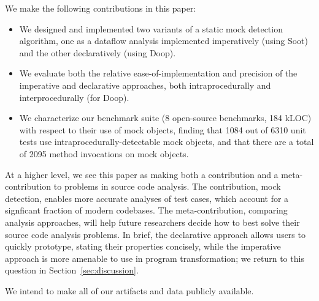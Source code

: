 We make the following contributions in this paper:
\begin{itemize}
\item We designed and implemented two variants of a static mock detection algorithm, one as a dataflow analysis implemented imperatively (using Soot) and the other declaratively (using Doop).
\item We evaluate both the relative ease-of-implementation and precision of the imperative and declarative approaches, both intraprocedurally and interprocedurally (for Doop). %
\item We characterize our benchmark suite (8 open-source benchmarks, 184 kLOC) with respect to their use of mock objects, finding that 1084 out of 6310 unit tests use intraprocedurally-detectable mock objects, and that there are a total of 2095 method invocations on mock objects. %
\end{itemize}
At a higher level, we see this paper as making both a contribution and a meta-contribution to
problems in source code analysis. The contribution, mock detection, enables more accurate analyses
of test cases, which account for a signficant fraction of modern codebases. The meta-contribution,
comparing analysis approaches, will help future researchers decide how to best solve their
source code analysis problems. In brief, the declarative approach allows users to quickly prototype, stating their properties
concisely, while the imperative approach is more amenable to use in program transformation; we return
to this question in Section~\ref{sec:discussion}.

We intend to make all of our artifacts and data publicly available.

